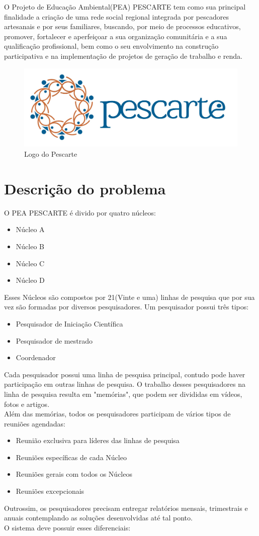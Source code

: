 \documentclass[11pt]{../../classes/ifscarticle}
\begin{document}
O Projeto de Educação Ambiental(PEA) PESCARTE tem como sua principal finalidade a criação de uma rede social regional integrada por pescadores artesanais e por seus familiares, buscando, por meio de processos educativos, promover, fortalecer e aperfeiçoar a sua organização comunitária e a sua qualificação profissional, bem como o seu envolvimento na construção participativa e na implementação de projetos de geração de trabalho e renda.
\begin{figure}[ht]
    \centering
    \includegraphics[width=.5\linewidth]{figuras/logoPescarte}
    \caption{Logo do Pescarte}
    \label{fig:logolatex}
\end{figure}

\section{Descrição do problema}

O PEA PESCARTE é divido por quatro núcleos:
\begin{itemize}
    \item Núcleo A
    \item Núcleo B
    \item Núcleo C
    \item Núcleo D
\end{itemize}
Esses Núcleos são compostos por 21(Vinte e uma) linhas
de pesquisa que por sua vez são formadas por
diversos pesquisadores. Um pesquisador possui três tipos:
\begin{itemize}
    \item Pesquisador de Iniciação Científica
    \item Pesquisador de mestrado
    \item Coordenador
\end{itemize}
Cada pesquisador possui uma linha de pesquisa principal,
contudo pode haver participação em outras linhas de pesquisa.
O trabalho desses pesquisadores na linha de pesquisa resulta
em "memórias", que podem ser divididas em vídeos, fotos e artigos.\\
Além das memórias, todos os pesquisadores participam de vários tipos
de reuniões agendadas:
\begin{itemize}
    \item Reunião exclusiva para líderes das linhas de pesquisa
    \item Reuniões específicas de cada Núcleo
    \item Reuniões gerais com todos os Núcleos
    \item Reuniões excepcionais
\end{itemize}
Outrossim, os pesquisadores precisam entregar relatórios mensais,
trimestrais e anuais contemplando as soluções desenvolvidas até tal ponto.\\
\clearpage
O sistema deve possuir esses diferenciais:
\end{document}
